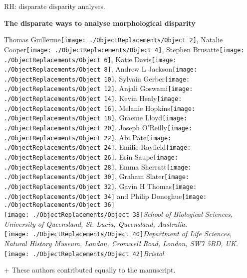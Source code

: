 RH: disparate disparity analyses.

\textbf{The disparate ways to analyse morphological disparity}

Thomas
Guillerme\texttt{[image: ./ObjectReplacements/Object 2]},
Natalie
Cooper\texttt{[image: ./ObjectReplacements/Object 4]},
Stephen
Brusatte\texttt{[image: ./ObjectReplacements/Object 6]},
Katie
Davis\texttt{[image: ./ObjectReplacements/Object 8]},
Andrew L
Jackson\texttt{[image: ./ObjectReplacements/Object 10]},
Sylvain
Gerber\texttt{[image: ./ObjectReplacements/Object 12]},
Anjali
Goswami\texttt{[image: ./ObjectReplacements/Object 14]},
Kevin
Healy\texttt{[image: ./ObjectReplacements/Object 16]},
Melanie
Hopkins\texttt{[image: ./ObjectReplacements/Object 18]},
Graeme
Lloyd\texttt{[image: ./ObjectReplacements/Object 20]},
Joseph
O'Reilly\texttt{[image: ./ObjectReplacements/Object 22]},
Abi
Pate\texttt{[image: ./ObjectReplacements/Object 24]},
Emilie
Rayfield\texttt{[image: ./ObjectReplacements/Object 26]},
Erin
Saupe\texttt{[image: ./ObjectReplacements/Object 28]},
Emma
Sherratt\texttt{[image: ./ObjectReplacements/Object 30]},
Graham
Slater\texttt{[image: ./ObjectReplacements/Object 32]},
Gavin H
Thomas\texttt{[image: ./ObjectReplacements/Object 34]}
and Philip
Donoghue\texttt{[image: ./ObjectReplacements/Object 36]}\\
\texttt{[image: ./ObjectReplacements/Object 38]}\emph{School
of Biological Sciences, University of Queensland, St. Lucia, Queensland,
Australia.}\\
\texttt{[image: ./ObjectReplacements/Object 40]}\emph{Department
of Life Sciences, Natural History Museum, London, Cromwell Road, London,
SW7 5BD, UK.}\\
\texttt{[image: ./ObjectReplacements/Object 42]}\emph{Bristol}

+ These authors contributed equally to the manuscript.

